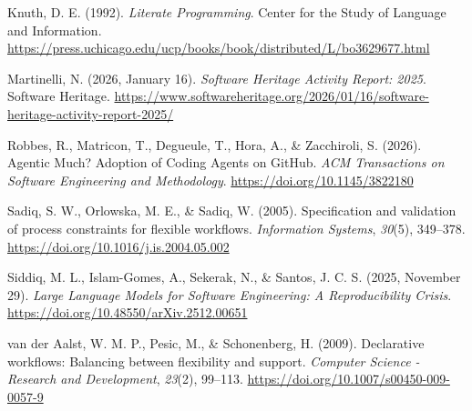 \documentclass[
  man,
  floatsintext,
  longtable,
  nolmodern,
  notxfonts,
  notimes,
  12pt,
  colorlinks=true,linkcolor=blue,citecolor=blue,urlcolor=blue]{apa7}
\newlength{\cslhangindent}
\newenvironment{CSLReferences}[2] %
 {\begin{list}{}{%
  \setlength{\itemindent}{0pt}
  \setlength{\leftmargin}{0pt}
  \setlength{\parsep}{0pt}
  \ifodd #1
   \setlength{\leftmargin}{\cslhangindent}
   \setlength{\itemindent}{-1\cslhangindent}
  \fi
  \setlength{\itemsep}{#2\baselineskip}}}
 {\end{list}}
\begin{document}
\begin{CSLReferences}{1}{0}
Knuth, D. E. (1992). \emph{Literate {Programming}}. {Center for the
Study of Language and Information}.
\url{https://press.uchicago.edu/ucp/books/book/distributed/L/bo3629677.html}

Martinelli, N. (2026, January 16). \emph{Software {Heritage Activity
Report}: 2025}. Software Heritage.
\url{https://www.softwareheritage.org/2026/01/16/software-heritage-activity-report-2025/}

Robbes, R., Matricon, T., Degueule, T., Hora, A., \& Zacchiroli, S.
(2026). Agentic {Much}? {Adoption} of {Coding Agents} on {GitHub}.
\emph{ACM Transactions on Software Engineering and Methodology}.
\url{https://doi.org/10.1145/3822180}

Sadiq, S. W., Orlowska, M. E., \& Sadiq, W. (2005). Specification and
validation of process constraints for flexible workflows.
\emph{Information Systems}, \emph{30}(5), 349--378.
\url{https://doi.org/10.1016/j.is.2004.05.002}

Siddiq, M. L., Islam-Gomes, A., Sekerak, N., \& Santos, J. C. S. (2025,
November 29). \emph{Large {Language Models} for {Software Engineering}:
{A Reproducibility Crisis}}.
\url{https://doi.org/10.48550/arXiv.2512.00651}

van der Aalst, W. M. P., Pesic, M., \& Schonenberg, H. (2009).
Declarative workflows: {Balancing} between flexibility and support.
\emph{Computer Science - Research and Development}, \emph{23}(2),
99--113. \url{https://doi.org/10.1007/s00450-009-0057-9}

\end{CSLReferences}
\end{document}
